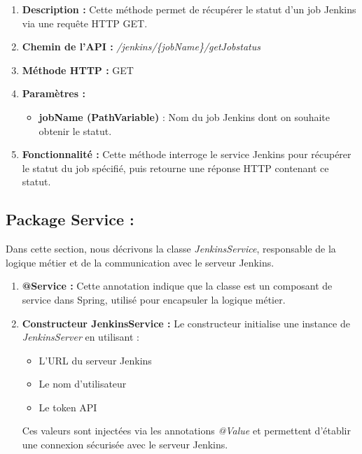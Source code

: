 \begin{enumerate}
    \item \textbf{Description :} Cette méthode permet de récupérer le statut d’un job Jenkins via une requête HTTP GET.

    \item \textbf{Chemin de l’API :} \textit{/jenkins/\{jobName\}/getJobstatus}

    \item \textbf{Méthode HTTP :} GET

    \item \textbf{Paramètres :}
    \begin{itemize}
        \item \textbf{jobName (PathVariable)} : Nom du job Jenkins dont on souhaite obtenir le statut.
    \end{itemize}

    \item \textbf{Fonctionnalité :}  
    Cette méthode interroge le service Jenkins pour récupérer le statut du job spécifié, puis retourne une réponse HTTP contenant ce statut.
\end{enumerate}

\subsection*{Package Service :}

Dans cette section, nous décrivons la classe \textit{JenkinsService}, responsable de la logique métier et de la communication avec le serveur Jenkins.

\begin{enumerate}
    \item \textbf{@Service :}  
    Cette annotation indique que la classe est un composant de service dans Spring, utilisé pour encapsuler la logique métier.

    \item \textbf{Constructeur JenkinsService :}  
    Le constructeur initialise une instance de \textit{JenkinsServer} en utilisant :
    \begin{itemize}
        \item L’URL du serveur Jenkins
        \item Le nom d’utilisateur
        \item Le token API
    \end{itemize}
    Ces valeurs sont injectées via les annotations \textit{@Value} et permettent d’établir une connexion sécurisée avec le serveur Jenkins.
\end{enumerate}
